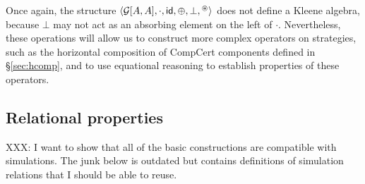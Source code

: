 Once again,
the structure
$\langle \mathcal{G}[A,A], \cdot,  \mathsf{id} , \oplus, \bot, {}^\oast \rangle$
does not define a Kleene algebra,
because $\bot$ may not act as an absorbing element
on the left of $\cdot$.
Nevertheless,
these operations will allow us to construct
more complex operators on strategies,
such as the horizontal composition of CompCert components
defined in \S\ref{sec:hcomp},
and to use equational reasoning to
establish properties of these operators.


\subsection{Relational properties} %

XXX: I want to show that all of the basic constructions
are compatible with simulations.
The junk below is outdated but contains
definitions of simulation relations that I should be able
to reuse.

